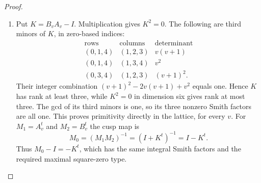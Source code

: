 \begin{proof}
\begin{enumerate}[label={$\langle1\rangle$\arabic*.}]
The exact unit needed in the hatted lattice is
\[
 z=(-v^3+v-1,0,0,2,2(1-v^2))^t.
\]
Writing $a=-v^3+v-1$, the first coordinate of $Y'z$ is
$-2a-2+2v(1-v^2)=0$. Half its second coordinate is
$(1-v)a+(v^2-v)+q(1-v^2)=0$, since the first two terms
sum to $v^4-v^3+v-1$ and the last is its negative. Furthermore
\[
 \beta z=s(v^3-v-1)+2v^2r=1.
 \tag{F.U5}\hypertarget{tag-02IR}{}\label{maps:eq:F.U5}
\]
Indeed the two summands expand to
$v^5+v^4-2v^3-2v^2+1$ and
$-v^5-v^4+2v^3+2v^2$.
Since $AB=I-N$ and $NPz=X(Y'z)=0$, the six-dimensional
map satisfies
\[
 (\widehat A\widehat B-I)(0,z)^t=e_0.
\]
This establishes the unit in the displayed hatted coordinates.

The row identity
$\beta(I+B'+B'^2+B'^3)=0$ proves
$\widehat B^4=I$; also $\widehat A^5=I$. Their quotient actions
show that these orders are exact.

Use the lattice change
\[
 L=\frac14\begin{pmatrix}
 -2&3&-5&-1&5&-3\\
 0&2&-2&2&-2&2\\
 0&-4&0&0&4&-4\\
 0&0&0&-4&4&-4\\
 0&0&4&-4&4&-4\\
 0&0&0&-4&4&0
 \end{pmatrix},\qquad
 A_v=L^{-1}\widehat A L,\quad B_v=L^{-1}\widehat B L.
 \tag{F.U6}\hypertarget{tag-02IS}{}\label{maps:eq:F.U6}
\]
Here $\det L=-1/4$. Expanding these products gives entries in
$\mathbb Z[v]$ for both matrices, with
$LA_v=\widehat A L$ and $LB_v=\widehat B L$. Thus the
defined matrices act on the stated $\mathbb Z^6$ for every integer
parameter. Their determinants are one and their inverses are
the integer powers $A_v^4,B_v^3$. Their characteristic polynomials are
\[
 (x-1)^2\Phi_5(x),\qquad (x-1)^2(x+1)^2(x^2+1),
\]
respectively.

\item Put $K=B_vA_v-I$. Multiplication gives $K^2=0$.
The following are third minors of $K$, in zero-based indices:
\[
 \begin{array}{c|c|c}
 \text{rows}&\text{columns}&\text{determinant}\\\hline
 (0,1,4)&(1,2,3)&v(v+1)\\
 (0,1,4)&(1,3,4)&v^2\\
 (0,3,4)&(1,2,3)&(v+1)^2.
 \end{array}
\]
Their integer combination $(v+1)^2-2v(v+1)+v^2$ equals one.
Hence $K$ has rank at least three, while $K^2=0$ in dimension six
gives rank at most three. The gcd of its third minors is one,
so its three nonzero Smith factors are all one. This proves
primitivity directly in the lattice, for every $v$.
For $M_1=A_v^t$ and $M_2=B_v^t$ the cusp map is
\[
 M_0=(M_1M_2)^{-1}=(I+K^t)^{-1}=I-K^t.
\]
Thus $M_0-I=-K^t$, which has the same integral Smith factors
and the required maximal square-zero type.


\end{enumerate}
\end{proof}
